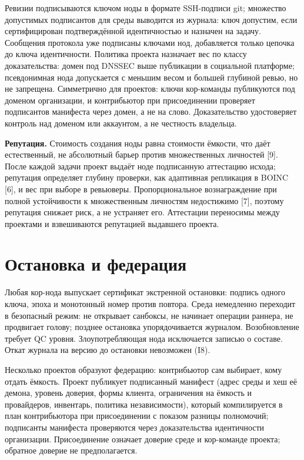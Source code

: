 \documentclass[11pt,a4paper]{article}
\begin{document}
Ревизии подписываются ключом ноды в формате SSH-подписи git; множество допустимых подписантов для среды выводится из журнала: ключ допустим, если сертифицирован подтверждённой идентичностью и назначен на задачу. Сообщения протокола уже подписаны ключами нод, добавляется только цепочка до ключа идентичности. Политика проекта назначает вес по классу доказательства: домен под DNSSEC выше публикации в социальной платформе; псевдонимная нода допускается с меньшим весом и большей глубиной ревью, но не запрещена. Симметрично для проектов: ключи кор-команды публикуются под доменом организации, и контрибьютор при присоединении проверяет подписантов манифеста через домен, а не на слово. Доказательство удостоверяет контроль над доменом или аккаунтом, а не честность владельца.

\textbf{Репутация.} Стоимость создания ноды равна стоимости ёмкости, что даёт естественный, не абсолютный барьер против множественных личностей [9]. После каждой задачи проект выдаёт ноде подписанную аттестацию исхода; репутация определяет глубину проверки, как адаптивная репликация в BOINC [6], и вес при выборе в ревьюверы. Пропорциональное вознаграждение при полной устойчивости к множественным личностям недостижимо [7], поэтому репутация снижает риск, а не устраняет его. Аттестации переносимы между проектами и взвешиваются репутацией выдавшего проекта.

\section{Остановка и федерация}

Любая кор-нода выпускает сертификат экстренной остановки: подпись одного ключа, эпоха и монотонный номер против повтора. Среда немедленно переходит в безопасный режим: не открывает санбоксы, не начинает операции раннера, не продвигает голову; позднее остановка упорядочивается журналом. Возобновление требует QC уровня. Злоупотребляющая нода исключается записью о составе. Откат журнала на версию до остановки невозможен (I8).

Несколько проектов образуют федерацию: контрибьютор сам выбирает, кому отдать ёмкость. Проект публикует подписанный манифест (адрес среды и хеш её демона, уровень доверия, формы клиента, ограничения на ёмкость и провайдеров, инвентарь, политика независимости), который компилируется в план контрибьютора при присоединении с показом разницы полномочий; подписанты манифеста проверяются через доказательства идентичности организации. Присоединение означает доверие среде и кор-команде проекта; обратное доверие не предполагается.
\end{document}
